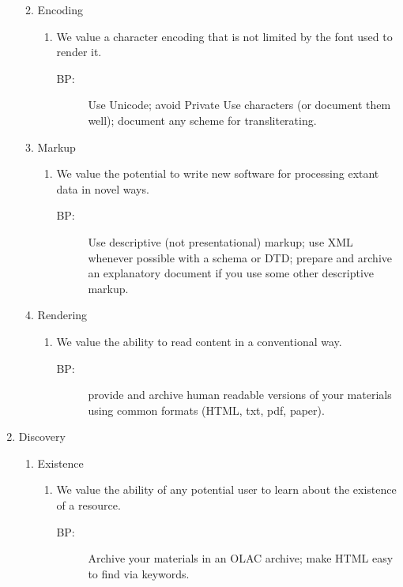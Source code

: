 \documentclass{article}
\begin{document}
\begin{enumerate}
\begin{enumerate}
\begin{enumerate}
\begin{description}
      \end{description}
    \end{enumerate}
    \item Encoding
    \begin{enumerate}
      \item We value a character encoding that is not limited by the font used to render it.
      \begin{description}
        \item[BP:] Use Unicode; avoid Private Use characters (or document them well); document any scheme for transliterating.
      \end{description}
    \end{enumerate}
    \item Markup
    \begin{enumerate}
      \item We value the potential to write new software for processing extant data in novel ways.
      \begin{description}
      \item[BP:]  Use descriptive (not presentational) markup; use XML whenever possible with a schema or DTD; prepare and archive an explanatory document if you use some other descriptive markup. 
      \end{description}
    \end{enumerate}
    \item Rendering
    \begin{enumerate}
    \item We value the ability to read content in a conventional way.
      \begin{description}
        \item[BP:]  provide and archive human readable versions of your materials using common formats (HTML, txt, pdf, paper).
      \end{description}
    \end{enumerate}
  \end{enumerate}
  \item Discovery
    \begin{enumerate}
      \item Existence
      \begin{enumerate}        
        \item We value the ability of any potential user to learn about the existence of a resource.
        \begin{description}
          \item[BP:]  Archive your materials in an OLAC archive; make HTML easy to find via keywords.

\end{description}
\end{enumerate}
\end{enumerate}
\end{enumerate}
\end{document}
